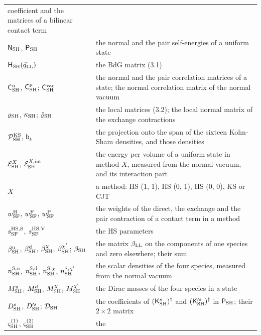 \documentclass[
  10pt,
]{article}
\begin{document}
\begin{longtable}[]{@{}
  >{\raggedright\arraybackslash}p{}
  >{\raggedright\arraybackslash}p{}@{}}
coefficient and the matrices of a bilinear contact term \\
\(\mathsf N_{\rm SH}\), \(\mathsf P_{\rm SH}\) & the normal and the pair
self-energies of a uniform state \\
\(\mathsf H_{\rm SH}(\vec q_{\rm LL})\) & the BdG matrix (3.1) \\
\(\mathsf C^{\rm n}_{\rm SH}\), \(\mathsf C^{\rm p}_{\rm SH}\);
\(\mathsf C^{\rm vac}_{\rm SH}\) & the normal and the pair correlation
matrices of a state; the normal correlation matrix of the normal
vacuum \\
\(\varrho_{\rm SH}\), \(\kappa_{\rm SH}\); \(\tilde\varrho_{\rm SH}\) &
the local matrices (3.2); the local normal matrix of the exchange
contractions \\
\(\mathcal P^{\rm KS}_{\rm SH}\), \(\mathsf b_k\) & the projection onto
the span of the sixteen Kohn-Sham densities, and those densities \\
\(\mathcal E^X_{\rm SH}\), \(\mathcal E^{X,{\rm int}}_{\rm SH}\) & the
energy per volume of a uniform state in method \(X\), measured from the
normal vacuum, and its interaction part \\
\(X\) & a method: HS (1, 1), HS (0, 1), HS (0, 0), KS or CJT \\
\(w^{\rm H}_{\rm SF}\), \(w^{\rm F}_{\rm SF}\), \(w^{\rm P}_{\rm SF}\) &
the weights of the direct, the exchange and the pair contraction of a
contact term in a method \\
\(s^{\rm HS,S}_{\rm SF}\), \(s^{\rm HS,V}_{\rm SF}\) & the HS
parameters \\
\(\beta^{\rm u}_{\rm SH}\), \(\beta^{\rm d}_{\rm SH}\),
\(\beta^\chi_{\rm SH}\), \(\beta^{\chi'}_{\rm SH}\); \(\beta_{\rm SH}\)
& the matrix \(\beta_{\rm LL}\) on the components of one species and
zero elsewhere; their sum \\
\(n^{\rm S,u}_{\rm SH}\), \(n^{\rm S,d}_{\rm SH}\),
\(n^{{\rm S},\chi}_{\rm SH}\), \(n^{{\rm S},\chi'}_{\rm SH}\) & the
scalar densities of the four species, measured from the normal vacuum \\
\(M^{\rm u}_{\rm SH}\), \(M^{\rm d}_{\rm SH}\), \(M^\chi_{\rm SH}\),
\(M^{\chi'}_{\rm SH}\) & the Dirac masses of the four species in a
state \\
\(D^s_{\rm SH}\), \(D'^s_{\rm SH}\); \(\mathcal D_{\rm SH}\) & the
coefficients of \((\mathsf K^s_{\rm SH})^\dagger\) and
\((\mathsf K'^s_{\rm SH})^\dagger\) in \(\mathsf P_{\rm SH}\); their
\(2\times2\) matrix \\
\(\varsigma^{(1)}_{\rm SH}\), \(\varsigma^{(2)}_{\rm SH}\) & the

\end{longtable}
\end{document}
